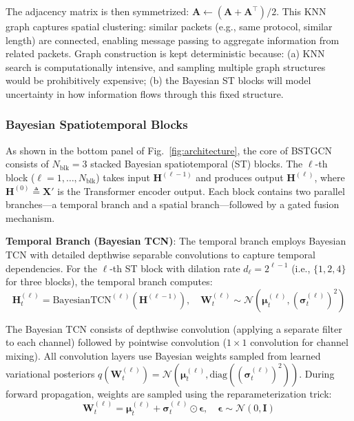 \documentclass[lettersize,journal]{IEEEtran}
\begin{document}
The adjacency matrix is then symmetrized: $\mathbf{A} \leftarrow (\mathbf{A} + \mathbf{A}^\top) / 2$. This KNN graph captures spatial clustering: similar packets (e.g., same protocol, similar length) are connected, enabling message passing to aggregate information from related packets. Graph construction is kept deterministic because: (a) KNN search is computationally intensive, and sampling multiple graph structures would be prohibitively expensive; (b) the Bayesian ST blocks will model uncertainty in how information flows through this fixed structure.

\subsubsection{Bayesian Spatiotemporal Blocks}

As shown in the bottom panel of Fig.~\ref{fig:architecture}, the core of BSTGCN consists of $N_{\text{blk}}=3$ stacked Bayesian spatiotemporal (ST) blocks. The $\ell$-th block ($\ell=1,\ldots,N_{\text{blk}}$) takes input $\mathbf{H}^{(\ell-1)}$ and produces output $\mathbf{H}^{(\ell)}$, where $\mathbf{H}^{(0)}\triangleq \mathbf{X}'$ is the Transformer encoder output. Each block contains two parallel branches---a temporal branch and a spatial branch---followed by a gated fusion mechanism.

\textbf{Temporal Branch (Bayesian TCN)}: The temporal branch employs Bayesian TCN with detailed depthwise separable convolutions to capture temporal dependencies. For the $\ell$-th ST block with dilation rate $d_\ell = 2^{\ell-1}$ (i.e., $\{1, 2, 4\}$ for three blocks), the temporal branch computes:
\begin{equation}
\mathbf{H}_t^{(\ell)} = \text{BayesianTCN}^{(\ell)}(\mathbf{H}^{(\ell-1)}), \quad \mathbf{W}_t^{(\ell)} \sim \mathcal{N}(\boldsymbol{\mu}_t^{(\ell)}, (\boldsymbol{\sigma}_t^{(\ell)})^2)
\end{equation}

The Bayesian TCN consists of depthwise convolution (applying a separate filter to each channel) followed by pointwise convolution ($1\times1$ convolution for channel mixing). All convolution layers use Bayesian weights sampled from learned variational posteriors $q(\mathbf{W}_t^{(\ell)}) = \mathcal{N}(\boldsymbol{\mu}_t^{(\ell)}, \text{diag}((\boldsymbol{\sigma}_t^{(\ell)})^2))$. During forward propagation, weights are sampled using the reparameterization trick:
\begin{equation}
\mathbf{W}_t^{(\ell)} = \boldsymbol{\mu}_t^{(\ell)} + \boldsymbol{\sigma}_t^{(\ell)} \odot \boldsymbol{\epsilon}, \quad \boldsymbol{\epsilon} \sim \mathcal{N}(0, \mathbf{I})
\end{equation}
\end{document}
